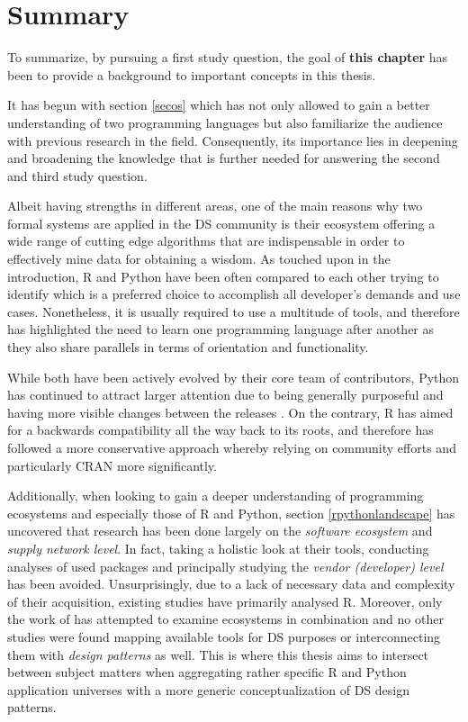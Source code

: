 \section{Summary} 
To summarize, by pursuing a first study question, the goal of \textbf{this chapter} has been to provide a background to important concepts in this thesis.

It has begun with section \ref{secos} which has not only allowed to gain a better understanding of two programming languages but also familiarize the audience with previous research in the field.
Consequently, its importance lies in deepening and broadening the knowledge that is further needed for answering the second and third study question. 

Albeit having strengths in different areas, one of the main reasons why two formal systems are applied in the \ac{DS} community is their ecosystem offering a wide range of cutting edge algorithms that are indispensable in order to effectively mine data for obtaining a wisdom.
As touched upon in the introduction, R and Python have been often compared to each other trying to identify which is a preferred choice to accomplish all developer's demands and use cases.
Nonetheless, it is usually required to use a multitude of tools, and therefore \textcite{Theuwissen2016} has highlighted the need to learn one programming language after another as they also share parallels in terms of orientation and functionality.

While both have been actively evolved by their core team of contributors, Python has continued to attract larger attention due to being generally purposeful and having more visible changes between the releases \parencite{Cass2017}.
On the contrary, R has aimed for a backwards compatibility all the way back to its roots, and therefore has followed a more conservative approach whereby relying on community efforts and particularly \ac{CRAN} more significantly.

Additionally, when looking to gain a deeper understanding of programming ecosystems and especially those of R and Python, section \ref{rpythonlandscape} has uncovered that research has been done largely on the \emph{software ecosystem} and \emph{supply network level}. 
In fact, taking a holistic look at their tools, conducting analyses of used packages and principally studying the \emph{vendor (developer) level} has been avoided. 
Unsurprisingly, due to a lack of necessary data and complexity of their acquisition, existing studies have primarily analysed R. 
Moreover, only the work of \textcite{Eleni2017} has attempted to examine ecosystems in combination and no other studies were found mapping available tools for \ac{DS} purposes or interconnecting them with \emph{design patterns} as well.
This is where this thesis aims to intersect between subject matters when aggregating rather specific R and Python application universes with a more generic conceptualization of \ac{DS} design patterns.

